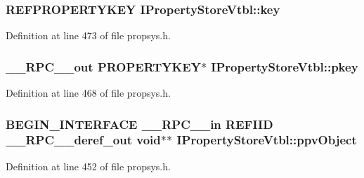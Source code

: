 \subsubsection[{\texorpdfstring{key}{key}}]{ {\bf R\+E\+F\+P\+R\+O\+P\+E\+R\+T\+Y\+K\+EY} I\+Property\+Store\+Vtbl\+::key}\hypertarget{struct_i_property_store_vtbl_a78fd64ec63cedc4138981c035217ee45}{}\label{struct_i_property_store_vtbl_a78fd64ec63cedc4138981c035217ee45}


Definition at line 473 of file propsys.\+h.

\subsubsection[{\texorpdfstring{pkey}{pkey}}]{ {\bf \+\_\+\+\_\+\+R\+P\+C\+\_\+\+\_\+out} {\bf P\+R\+O\+P\+E\+R\+T\+Y\+K\+EY}$\ast$ I\+Property\+Store\+Vtbl\+::pkey}\hypertarget{struct_i_property_store_vtbl_ada2d8e075fc63635721a47674ca847f6}{}\label{struct_i_property_store_vtbl_ada2d8e075fc63635721a47674ca847f6}


Definition at line 468 of file propsys.\+h.

\subsubsection[{\texorpdfstring{ppv\+Object}{ppvObject}}]{\setlength{\rightskip}{0pt plus 5cm}B\+E\+G\+I\+N\+\_\+\+I\+N\+T\+E\+R\+F\+A\+CE {\bf \+\_\+\+\_\+\+R\+P\+C\+\_\+\+\_\+in} {\bf R\+E\+F\+I\+ID} {\bf \+\_\+\+\_\+\+R\+P\+C\+\_\+\+\_\+deref\+\_\+out} {\bf void}$\ast$$\ast$ I\+Property\+Store\+Vtbl\+::ppv\+Object}\hypertarget{struct_i_property_store_vtbl_a1df1b1be37b35281766920a996cb3bba}{}\label{struct_i_property_store_vtbl_a1df1b1be37b35281766920a996cb3bba}


Definition at line 452 of file propsys.\+h.


